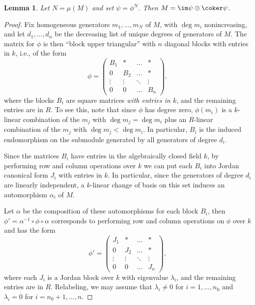 \documentclass[12pt]{article}
\let\b\beta
\def\ZZ{\mathbb Z}
\theoremstyle{theorem}
\numberwithin{thm}{section}
\newtheorem{lem}[thm]{Lemma}
\theoremstyle{definition}
\begin{document}

\begin{lem}\label{lem:graded_algorithm}
  Let $N = \mu(M)$ and set $\psi = \phi^N$. Then $M = \im\psi \oplus \coker\psi$.
\end{lem}
\begin{proof}
  Fix homogeneous generators $m_1,\dots,m_N$ of $M$, with $\deg m_i$ nonincreasing, and let $d_1,\dots,d_n$ be the decreasing list of unique degrees of generators of $M$. The matrix for $\phi$ is then ``block upper triangular'' with $n$ diagonal blocks with entries in $k$, i.e., of the form
  \[ \phi = \begin{pmatrix}
    B_1    & *      & \dots  & *      \\
    0      & B_2    & \dots  & *      \\
    \vdots & \vdots & \ddots & \vdots \\
    0      & 0      & \dots  & B_n
  \end{pmatrix}, \]
  where the blocks $B_i$ are square matrices \emph{with entries in $k$}, and the remaining entries are in $R$. To see this, note that since $\phi$ has degree zero, $\phi(m_i)$ is a $k$-linear combination of the $m_j$ with $\deg m_j = \deg m_i$ plus an $R$-linear combination of the $m_j$ with $\deg m_j < \deg m_i$. In particular, $B_i$ is the induced endomorphism on the submodule generated by all generators of degree $d_i$.

  Since the matrices $B_i$ have entries in the algebraically closed field $k$, by performing row and column operations over $k$ we can put each $B_i$ into Jordan canonical form $J_i$ with entries in $k$. In particular, since the generators of degree $d_i$ are linearly independent, a $k$-linear change of basis on this set induces an automorphism $\alpha_i$ of $M$.

  Let $\alpha$ be the composition of these automorphisms for each block $B_i$, then $\phi' = \alpha^{-1}\circ\phi\circ\alpha$ corresponds to performing row and column operations on $\phi$ over $k$ and has the form
  \begin{equation}
    \label{eq:Jordan}
    \phi' = \begin{pmatrix}
      J_1    & *      & \dots  & *      \\
      0      & J_2    & \dots  & *      \\
      \vdots & \vdots & \ddots & \vdots \\
      0      & 0      & \dots  & J_n
    \end{pmatrix},
  \end{equation}
  where each $J_i$ is a Jordan block over $k$ with eigenvalue $\lambda_i$, and the remaining entries are in $R$.
  Relabeling, we may assume that $\lambda_i\neq 0$ for $i=1,\dots,n_0$ and $\lambda_i=0$ for $i=n_0+1,\dots,n$.


\end{proof}
\end{document}
